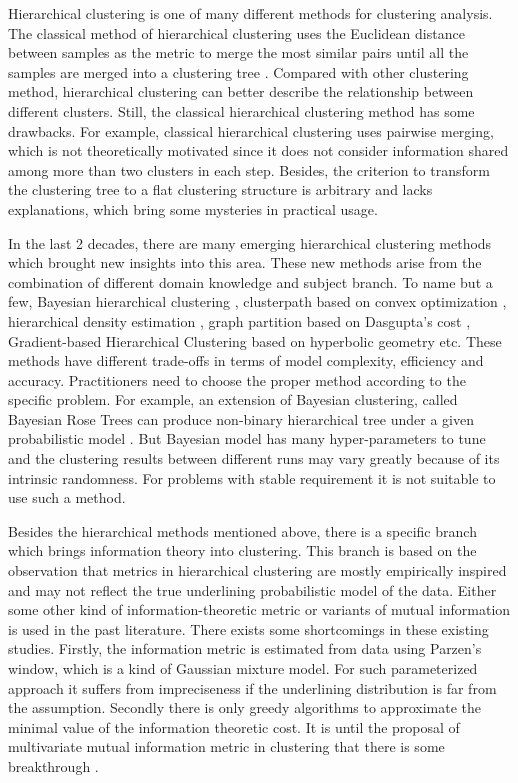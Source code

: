 Hierarchical clustering is one of many different methods for clustering analysis.
The classical method of hierarchical clustering uses the Euclidean distance between samples
as the metric to merge the most similar pairs until all the samples are merged into a clustering
tree \citep{slink}. Compared with other clustering method, hierarchical clustering can better describe the relationship between different clusters. Still, the classical hierarchical clustering method has some
drawbacks. For example, classical hierarchical clustering uses pairwise merging, which is not theoretically motivated since it does not consider information shared among more than two clusters in each step. Besides, the criterion to transform the clustering tree to a flat clustering structure is arbitrary and lacks explanations, which bring some mysteries in practical
usage.

In the last 2 decades, there are many emerging hierarchical clustering methods which brought new insights into this area. These new methods arise from the combination of different domain knowledge and
subject branch. To name but a few, 
Bayesian hierarchical clustering \citep{bhc},
clusterpath based on convex optimization \citep{hocking2011clusterpath},
hierarchical density estimation \citep{hde}, 
graph partition based on Dasgupta's cost \citep{dasgupta2016cost},
Gradient-based Hierarchical Clustering based on hyperbolic geometry \citep{hyperbolic} etc.
These methods have different trade-offs in terms of model complexity, efficiency and accuracy.
Practitioners need to choose the proper method according to the specific problem.
For example, an extension of Bayesian clustering, called Bayesian Rose Trees 
can produce non-binary hierarchical tree
under a given probabilistic model \citep{blundell2011discovering}.
But Bayesian model has many hyper-parameters to tune and the clustering results between different runs may vary greatly because of its intrinsic randomness. For problems with stable requirement it
is not suitable to use such a method.


Besides the hierarchical methods mentioned above, there is a specific branch which brings information theory into clustering. This branch is based on the observation that metrics in hierarchical clustering
are mostly empirically inspired and may not reflect the true underlining probabilistic model of the data.
Either some other kind of information-theoretic metric \citep{ic2002} or variants of mutual information \citep{mim} is used in the past literature. There exists some shortcomings in these existing studies. Firstly, the information metric is estimated from data using Parzen's window, which is a kind of Gaussian mixture model. For such parameterized approach it suffers from impreciseness if the underlining distribution is far from the assumption.
Secondly there is only greedy algorithms to approximate the minimal value of the information theoretic cost. It is until the proposal of multivariate mutual information metric in clustering that there is some breakthrough \citep{ic2016}.

